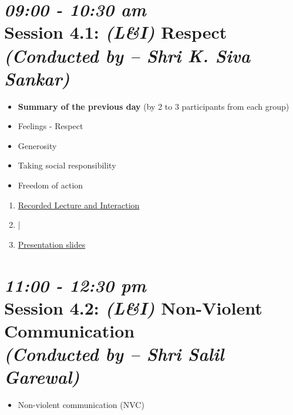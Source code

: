 \documentclass[11pt]{article}
\begin{document}

    \section*{{\it 09:00 - 10:30 am} \\
    Session 4.1: {\it (L\&I)} {\bf Respect} \\
    {\Large\it (Conducted by -- Shri K. Siva Sankar)}}

    \begin{itemize}
        \item {\bf Summary of the previous day} (by 2 to 3 participants from each group)
        \item Feelings - Respect
    \end{itemize}

    \begin{itemize}
        \item Generosity
        \item Taking social responsibility
        \item Freedom of action
    \end{itemize}

    \begin{enumerate}
        \item \href{https://www.youtube.com/watch?v=D1JPBblJbQc}{Recorded Lecture and Interaction}
        \item |
        \item \href{presentations/day4/respect.pdf}{Presentation slides}
    \end{enumerate}

    \section*{{\it 11:00 - 12:30 pm} \\
    Session 4.2: {\it (L\&I)} Non-Violent Communication \\
    {\Large\it (Conducted by -- Shri Salil Garewal)}}

    \begin{itemize}
        \item Non-violent communication (NVC)
    \end{itemize}
\end{document}
